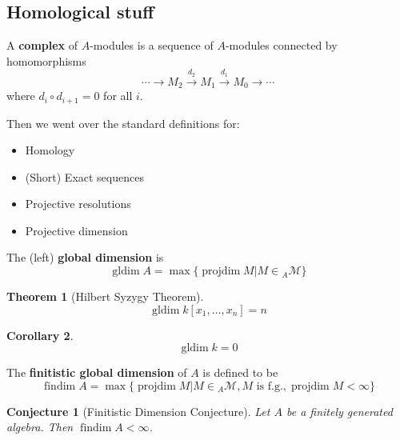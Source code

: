 \documentclass[12pt]{article}
\theoremstyle{break}
\theoremstyle{nonumberbreak}
\theoremstyle{changebreak}
\newtheorem{thm}{Theorem}[subsection]
\newtheorem{cor}[thm]{Corollary}
\theoremstyle{break}
\theoremstyle{nonumberbreak}
\theoremstyle{nonumberplain}
\newtheorem{conj}{Conjecture}
\theoremstyle{change}
\DeclareMathOperator{\gldim}{gldim}
\DeclareMathOperator{\projdim}{projdim}
\DeclareMathOperator{\findim}{findim}
\begin{document}
\subsection{Homological stuff}
\begin{defn}[Complex]
	A \textbf{complex} of $A$-modules is a sequence of $A$-modules connected by homomorphisms
	\[\cdots\to M_2\xrightarrow{d_2}M_1\xrightarrow{d_1} M_0\to \cdots\]
	where $d_i\circ d_{i+1}=0$ for all $i$.
\end{defn}
Then we went over the standard definitions for:
\begin{itemize}
	\item Homology
	\item (Short) Exact sequences
	\item Projective resolutions
	\item Projective dimension
\end{itemize}
\begin{defn}
	The (left) \textbf{global dimension} is
	\[\gldim A=\max\{\projdim M| M\in {_A\mathcal{M}}\}\]
\end{defn}
\begin{thm}[Hilbert Syzygy Theorem]
	\[\gldim k[x_1,\dots,x_n]=n\]
\end{thm}
\begin{cor}
	\[\gldim k= 0\]
\end{cor}
\begin{defn}
	The \textbf{finitistic global dimension} of $A$ is defined to be
	\[\findim A=\max\{\projdim M| M\in{_A\mathcal{M}}, M\text{ is f.g.},\projdim M <\infty\}\]
\end{defn}
\begin{conj}[Finitistic Dimension Conjecture]
	Let $A$ be a finitely generated algebra. Then $\findim A<\infty$.
\end{conj}
\end{document}
